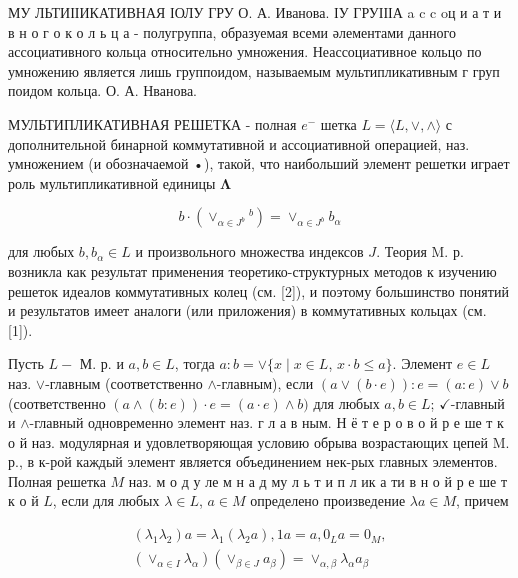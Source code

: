 \documentclass[10pt]{article}
\begin{document}
МУ ЛЬТИІІИКАТИВНАЯ ІОЛУ ГРУ О. А. Иванова. ІУ ГРУІІІА a c c oц и а т и в н о г о к о л ь ц а - полугруппа, образуемая всеми әлементами данного ассоциативного кольца относительно умножения. Неассоциативное кольцо по умножению является лишь группоидом, называемым мультипликативным г груп поидом кольца. О. А. Нванова.



МУЛЬТИПЛИКАТИВНАЯ РЕШЕТКА - полная $e^{-}$ шетка $L=\langle L, \vee, \wedge\rangle$ с дополнительной бинарной коммутативной и ассоциативной операцией, наз. умножением (и обозначаемой •), такой, что наибольший элемент решетки играет роль мультипликативной единицы $\boldsymbol{\Lambda}$



\[

b \cdot\left(\vee_{\alpha \in J^{b}}{ }^{b}\right)=\vee_{\alpha \in J^{b}} b_{\alpha}

\]



для любых $b, b_{\alpha} \in L$ и произвольного множества индексов $J$. Теория M. р. возникла как результат применения теоретико-структурных методов к изучению решеток идеалов коммутативных колец (см. [2]), и поэтому большинство понятий и результатов имеет аналоги (или приложения) в коммутативных кольцах (см. [1]).



Пусть $L-$ М. р. и $a, b \in L$, тогда $a: b=\vee\{x \mid x \in L$, $x \cdot b \leqslant a\}$. Элемент $e \in L$ наз. $\vee$-главным (соответственно $\wedge$-главным), если $(a \vee(b \cdot e)): e=(a: e) \vee b$ (соответственно $(a \wedge(b: e)) \cdot e=(a \cdot e) \wedge b)$ для любых $a, b \in L$; $\checkmark$-главный и $\wedge$-главный одновременно элемент наз. г л а в ным. Н ё т е р о в о й р е ше т к о й наз. модулярная и удовлетворяющая условию обрыва возрастающих цепей M. р., в к-рой каждый элемент является объединением нек-рых главных элементов. Полная решетка $M$ наз. м о д у ле м н а д му л ь т и п л ик а ти в н о й р е ше т к о й $L$, если для любых $\lambda \in L$, $a \in M$ определено произведение $\lambda a \in M$, причем



\[

\begin{gathered}

\left(\lambda_{1} \lambda_{2}\right) a=\lambda_{1}\left(\lambda_{2} a\right), 1 a=a, 0_{L} a=0_{M}, \\

\left(\vee_{\alpha \in I} \lambda_{\alpha}\right)\left(\vee_{\beta \in J} a_{\beta}\right)=\vee_{\alpha, \beta} \lambda_{\alpha} a_{\beta}

\end{gathered}

\]
\end{document}
